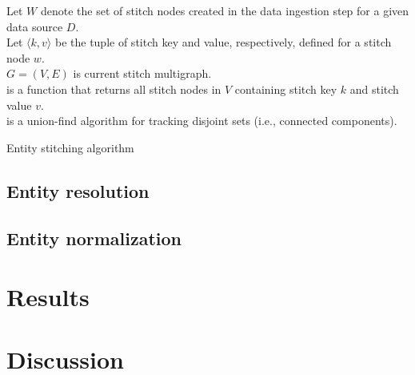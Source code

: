 \documentclass{bioinfo}
\begin{document}
\begin{methods}
\begin{algorithm}\label{algo:stitching}
\SetAlgoLined
\DontPrintSemicolon
Let $W$ denote the set of stitch nodes created in the data ingestion step for a given data source $D$.\\
Let $\langle k, v\rangle$ be the tuple of stitch key and value, respectively, defined for a stitch node $w$.\\
$G=(V,E)$ is current stitch multigraph.\\
 is a function that returns all stitch nodes in $V$ containing stitch key $k$ and stitch value $v$.\\
 is a union-find algorithm for tracking disjoint sets (i.e., connected components).\\
 \caption{Entity stitching algorithm}
\end{algorithm}

\subsection{Entity resolution}\label{sec:methods-er}

\subsection{Entity normalization}

\end{methods}

\section{Results}



\section{Discussion}


%
%
\end{document}
